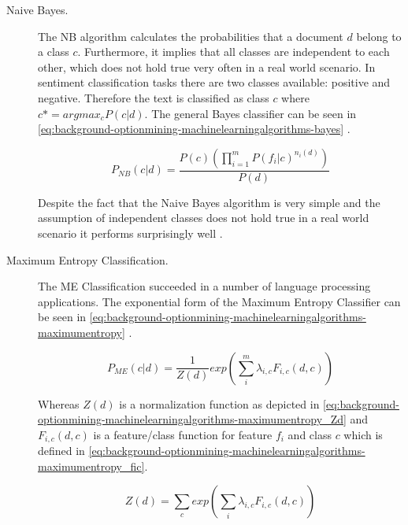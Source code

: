 \begin{description}
	\item[Naive Bayes.] 
    The \ac{NB} algorithm calculates the probabilities that a document $d$ belong to a class $c$.
	Furthermore, it implies that all classes are independent to each other, which does not hold true very often in a real world scenario.
	In sentiment classification tasks there are two classes available: positive and negative.
	Therefore the text is classified as class $c$ where $c* = arg max_c P(c | d)$.
	The general Bayes classifier can be seen in \autoref{eq:background-optionmining-machinelearningalgorithms-bayes} \cite{Pang2002}.
	
	\begin{equation}
		P_{NB}(c|d) = \frac{P(c) (\prod_{i=1}^{m} P(f_i|c)^{n_i(d)}) }{P(d)}
		\label{eq:background-optionmining-machinelearningalgorithms-bayes}
	\end{equation}
	
	Despite the fact that the Naive Bayes algorithm is very simple and the assumption of independent classes does not hold true in a real world scenario it performs surprisingly well \cite{Pang2002}.
	
	\item[Maximum Entropy Classification.]
  The \ac{ME} Classification succeeded in a number of language processing applications.
  The exponential form of the Maximum Entropy Classifier can be seen in \autoref{eq:background-optionmining-machinelearningalgorithms-maximumentropy} \cite{Pang2002}.
  
  \begin{equation}
    P_{ME}(c|d) = \frac{1}{Z(d)} exp \left( \sum_i^m \lambda_{i,c}F_{i,c}(d,c) \right)
    \label{eq:background-optionmining-machinelearningalgorithms-maximumentropy}
  \end{equation}
  
  Whereas $Z(d)$ is a normalization function as depicted in \autoref{eq:background-optionmining-machinelearningalgorithms-maximumentropy_Zd} \cite{Nigam1999} and $F_{i,c}(d,c)$ is a feature/class function for feature $f_i$ and class $c$ which is defined in \autoref{eq:background-optionmining-machinelearningalgorithms-maximumentropy_fic}.

  \begin{equation}
    Z(d) = \sum_c exp(\sum_i \lambda_{i,c} F_{i,c}(d,c))
      \label{eq:background-optionmining-machinelearningalgorithms-maximumentropy_Zd}
  \end{equation}


\end{description}
